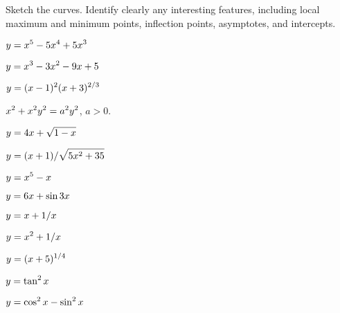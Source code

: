 \begin{exercises}

Sketch the curves. Identify clearly any interesting features, including
local maximum and minimum points, inflection points, asymptotes, and
intercepts. 

\twocol

\begin{exercise} $\displaystyle y=x^5-5x^4+5x^3$
\end{exercise}

\begin{exercise} $\displaystyle y=x^3-3x^2-9x+5$
\end{exercise}

\begin{exercise} $\displaystyle y=(x-1)^2(x+3)^{2/3}$
\end{exercise}

\begin{exercise} $\displaystyle x^2+x^2y^2=a^2y^2$, $a>0$.
\end{exercise}

\begin{exercise} $\displaystyle y = 4x+\sqrt{1-x}$
\end{exercise}

\begin{exercise} $\displaystyle y = (x+1)/\sqrt{5x^2 + 35}$
\end{exercise}

\begin{exercise} $\displaystyle y= x^5 - x$
\end{exercise}

\begin{exercise} $\displaystyle y = 6x + \sin 3x$
\end{exercise}

\begin{exercise} $\displaystyle y = x+ 1/x$
\end{exercise}

\begin{exercise} $\displaystyle y = x^2+ 1/x$
\end{exercise}

\begin{exercise} $\displaystyle y = (x+5)^{1/4}$
\end{exercise}

\begin{exercise} $\displaystyle y = \tan^2 x$
\end{exercise}

\begin{exercise} $\displaystyle y =\cos^2 x - \sin^2 x$
\end{exercise}


\end{exercises}
